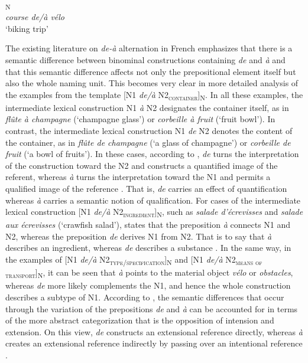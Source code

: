 \documentclass[output=paper]{langsci/langscibook}
\begin{document}
\ea{}\textsubscript{N}\\
\textit{course de/à vélo}\\
`biking trip'
\z

The existing literature on \textit{de-à} alternation in French emphasizes that there is a semantic difference between binominal constructions containing \textit{de} and \textit{à} and that this semantic difference affects not only the prepositional element itself but also the whole naming unit. This becomes very clear in more detailed analysis of the examples from the template [N1 \textit{de/à} N2\textsubscript{\scshape container}]\textsubscript{N}. In all these examples, the intermediate lexical construction N1 \textit{à} N2 designates the container itself, as in \textit{flûte à champagne} (`champagne glass') or \textit{corbeille à fruit} (`fruit bowl'). In contrast, the intermediate lexical construction N1 \textit{de} N2 denotes the content of the container, as in \textit{flûte de champagne} (`a glass of champagne') or \textit{corbeille de fruit} (`a bowl of fruits'). In these cases, according to \citet{Cadiot:1997}, \textit{de} turns the interpretation of the construction toward the N2 and constructs a quantified image of the referent, whereas \textit{à} turns the interpretation toward the N1 and permits a qualified image of the reference \citep[44]{Cadiot:1997}. That is, \textit{de} carries an effect of quantification whereas \textit{à} carries a semantic notion of qualification. For cases of the intermediate lexical construction [N1 \textit{de/à} N2\textsubscript{\scshape ingredient}]\textsubscript{N}, such as \textit{salade d’écrevisses} and \textit{salade aux écrevisses} (`crawfish salad'), \citet{Lang:1991} states that the preposition \textit{à} connects N1 and N2, whereas the preposition \textit{de} derives N1 from N2. That is to say that \textit{à} describes an ingredient, whereas \textit{de} describes a substance \citep[283]{Lang:1991}. In the same way, in the examples of [N1 \textit{de/à} N2\textsubscript{\scshape type/specification}]\textsubscript{N} and [N1 \textit{de/à} N2\textsubscript{\scshape means of transport}]\textsubscript{N}, it can be seen that \textit{à} points to the material object \textit{vélo} or \textit{obstacles}, whereas  \textit{de} more likely complements the N1, and hence the whole construction describes a subtype of N1. According to \citet[43]{Cadiot:1997}, the semantic differences that occur through the variation of the prepositions \textit{de} and \textit{à} can be accounted for in terms of the more abstract categorization that is the opposition of intension and extension. On this view, \textit{de} constructs an extensional reference  directly, whereas \textit{à} creates an extensional reference  indirectly by passing over an intentional reference \citep[62]{Cadiot:1997}. 
\end{document}
